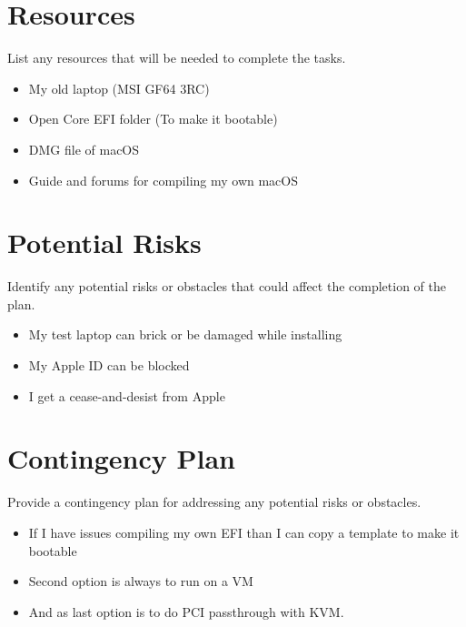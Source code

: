\documentclass{article}
\begin{document}
\section{Resources}

List any resources that will be needed to complete the tasks.

\begin{itemize}
\item My old laptop (MSI GF64 3RC)
\item Open Core EFI folder (To make it bootable)
\item DMG file of macOS
\item Guide and forums for compiling my own macOS
\end{itemize}

\section{Potential Risks}

Identify any potential risks or obstacles that could affect the completion of the plan.

\begin{itemize}
\item My test laptop can brick or be damaged while installing
\item My Apple ID can be blocked
\item I get a cease-and-desist from Apple
\end{itemize}

\section{Contingency Plan}

Provide a contingency plan for addressing any potential risks or obstacles.

\begin{itemize}
\item If I have issues compiling my own EFI than I can copy a template to make it bootable
\item Second option is always to run on a VM
\item And as last option is to do PCI passthrough with KVM.
\end{itemize}
\end{document}
